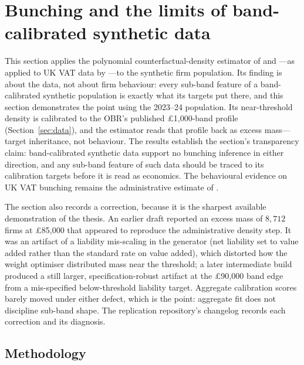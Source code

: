 \section{Bunching and the limits of band-calibrated synthetic data}
\label{sec:bunching}

This section applies the polynomial counterfactual-density estimator of
\citet{chettyetal2011} and \citet{klevenwaseem2013}---as applied to UK VAT
data by \citet{liuetal2021}---to the synthetic firm population. Its finding is
about the data, not about firm behaviour: every sub-band feature of a
band-calibrated synthetic population is exactly what its targets put there,
and this section demonstrates the point using the 2023--24
population. Its near-threshold density is calibrated to the OBR's published
\pounds1{,}000-band profile (Section~\ref{sec:data}), and the estimator reads
that profile back as excess mass---target inheritance, not behaviour. The
results establish the section's transparency claim: band-calibrated synthetic
data support no bunching inference in either direction, and any sub-band
feature of such data should be traced to its calibration targets before it is
read as economics. The behavioural evidence on UK VAT bunching remains the
administrative estimate of \citet{liuetal2021}.

The section also records a correction, because it is the sharpest available
demonstration of the thesis. An earlier draft reported an excess mass of
$8{,}712$ firms at \pounds85{,}000 that appeared to reproduce the
administrative density step. It was an artifact of a liability mis-scaling in
the generator (net liability set to value added rather than the standard rate
on value added), which distorted how the weight optimiser distributed mass
near the threshold; a later intermediate build produced a still larger,
specification-robust artifact at the \pounds90{,}000 band edge from a
mis-specified below-threshold liability target. Aggregate calibration scores
barely moved under either defect, which is the point: aggregate fit does not
discipline sub-band shape. The replication repository's changelog records
each correction and its diagnosis.

\subsection{Methodology}

